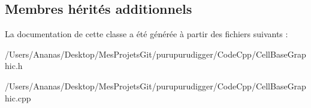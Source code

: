 \subsection*{Membres hérités additionnels}


La documentation de cette classe a été générée à partir des fichiers suivants \-:\begin{DoxyCompactItemize}
\item 
/\-Users/\-Ananas/\-Desktop/\-Mes\-Projets\-Git/purupurudigger/\-Code\-Cpp/Cell\-Base\-Graphic.\-h\item 
/\-Users/\-Ananas/\-Desktop/\-Mes\-Projets\-Git/purupurudigger/\-Code\-Cpp/Cell\-Base\-Graphic.\-cpp\end{DoxyCompactItemize}
